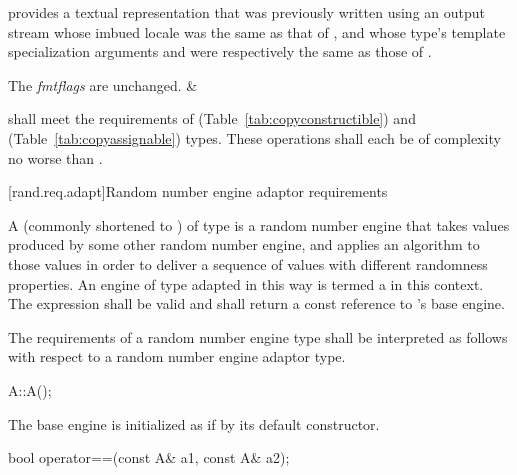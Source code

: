\begin{libreqtab4d}
    \requires
     provides a textual representation
    that was previously written
    using an output stream
    whose imbued locale
    was the same as that of ,
    and whose type's template specialization arguments
     and 
    were respectively the same as those of .

    \postconditions The \textit{fmtflags} are unchanged.
  & 
  \\
\end{libreqtab4d}

\pnum
{} shall meet the requirements
of  (Table~\ref{tab:copyconstructible})
and  (Table~\ref{tab:copyassignable}) types.
These operations shall each be of complexity
no worse than .


%



[rand.req.adapt]{Random number engine adaptor requirements}%

\pnum
A 
(commonly shortened to )
 of type 
is a random number engine
that takes values
produced by some other random number engine,
and applies an algorithm to those values
in order to deliver a sequence of values
with different randomness properties.
An engine  of type  adapted in this way
is termed a 
in this context.
The expression  shall be valid and shall return a
const reference to 's base engine.

\pnum
The requirements of a random number engine type
shall be interpreted as follows
with respect to a random number engine adaptor type.

\begin{itemdecl}
A::A();
\end{itemdecl}

\begin{itemdescr}
\pnum\effects
 The base engine is initialized
 as if by its default constructor.
\end{itemdescr}

\begin{itemdecl}
bool operator==(const A& a1, const A& a2);
\end{itemdecl}

